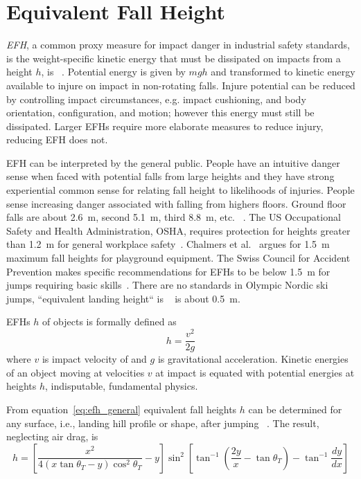 \documentclass[smallextended]{svjour3}       %
\begin{document}
\section{Equivalent Fall Height}
\label{sec:efh}
%
\emph{EFH}, a common proxy measure for impact danger in industrial safety
standards, is the weight-specific kinetic energy that must be dissipated on
impacts from a height $h$, is ~\cite{Hubbard2012}.  Potential energy is given
by  $mgh$ and transformed to kinetic energy available to injure on impact in
non-rotating falls. Injure potential can be reduced by controlling impact
circumstances, e.g.  impact cushioning, and body orientation, configuration,
and motion; however this energy must still be dissipated. Larger EFHs require
more elaborate measures to reduce injury, reducing EFH does not.

EFH can be interpreted by the general public. People have an intuitive danger
sense when faced with potential falls from large heights and they have strong
experiential common sense for relating fall height to likelihoods of injuries.
People sense increasing danger associated with falling from highers floors.
Ground floor falls are about 2.6~\si{\meter}, second 5.1~\si{\meter}, third
8.8~\si{\meter}, etc. ~\cite{Vish2005}. The US Occupational Safety and Health
Administration, OSHA, requires protection for heights greater than
1.2~\si{\meter} for general workplace safety~\cite{OSHA2021}.  Chalmers et
al.~\cite{Chalmers1996} argues for 1.5~\si{\meter} maximum fall heights for
playground equipment. The Swiss Council for Accident Prevention makes specific
recommendations for EFHs to be below 1.5~\si{\meter} for jumps requiring basic
skills~\cite{Heer2019}. There are no standards in Olympic Nordic ski jumps,
``equivalent landing height`` is ~\cite{Gasser2018} is about 0.5~\si{\meter}.

EFHs $h$ of objects is formally defined as
%
\begin{equation} h = \frac{v^2}{2g} \label{eq:efh_general} \end{equation}
%
where $v$ is impact velocity of  and $g$ is gravitational acceleration.
Kinetic energies of an object moving at velocities $v$ at impact is equated
with potential energies at heights $h$, indisputable, fundamental physics.

From equation~\ref{eq:efh_general} equivalent fall heights $h$ can be
determined for any surface, i.e., landing hill profile or shape, after jumping
~\cite{Petrone2017}. The result, neglecting air drag, is
%
\begin{equation}
  h = \left[\frac{x^2}{4(x\tan\theta_T - y)\cos^{2}\theta_T} -
    y\right]\sin^{2}\left[\tan^{-1}\left(\frac{2y}{x}- \tan\theta_T\right) -
    \tan^{-1}\frac{dy}{dx}\right]
  \label{eq:efh}
\end{equation}
\end{document}
